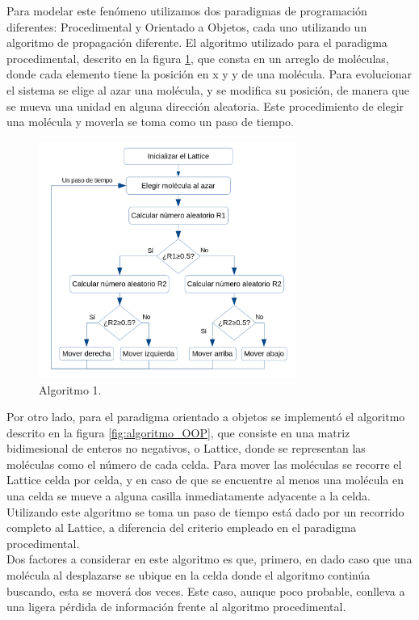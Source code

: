 \documentclass[12pt,twocolumn]{article}
\begin{document}
Para modelar este fenómeno utilizamos dos paradigmas de programación diferentes: Procedimental 
y Orientado a Objetos, cada uno utilizando un algoritmo de propagación diferente. El 
algoritmo utilizado para el paradigma procedimental, descrito en la figura 
\ref{fig:algoritmo_Proc}, que consta en un arreglo de moléculas, donde cada elemento tiene 
la posición en x y y de una molécula. Para evolucionar el sistema se elige al azar una molécula, 
y se modifica su posición, de manera que se mueva una unidad en alguna dirección aleatoria. 
Este procedimiento de elegir una molécula y moverla se toma como un paso de tiempo.
\\
\begin{figure}
    \centering
    \includegraphics[width=0.75\textwidth]{figs/Algoritmo_Proc.png}
    \caption{Algoritmo 1.}
    \label{fig:algoritmo_Proc}
\end{figure}

Por otro lado, para el paradigma orientado a objetos se implementó el algoritmo descrito 
en la figura \ref{fig:algoritmo_OOP}, que consiste en una matriz bidimesional de enteros no 
negativos, o Lattice, donde se representan las moléculas como el número de cada celda. Para 
mover las moléculas se recorre el Lattice celda por celda, y en caso de que se encuentre al 
menos una molécula en una celda se mueve a alguna casilla inmediatamente adyacente a la celda. 
Utilizando este algoritmo se toma un paso de tiempo está dado por un recorrido completo al 
Lattice, a diferencia del criterio empleado en el paradigma procedimental. 
\\

Dos factores a considerar en este algoritmo es que, primero, en dado caso que una molécula 
al desplazarse se ubique en la celda donde el algoritmo continúa buscando, esta se moverá 
dos veces. Este caso, aunque poco probable, conlleva a una ligera pérdida de información 
frente al algoritmo procedimental. 
\\
\end{document}
